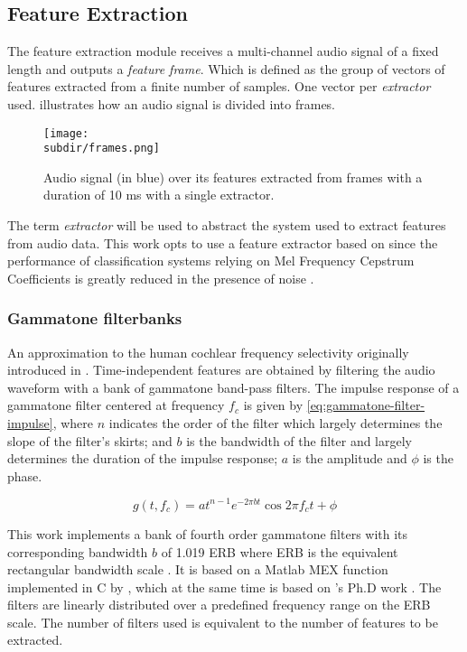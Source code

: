 \subsection{Feature Extraction} \label{subsec:feature-extraction}

The feature extraction module receives a multi-channel audio signal of a fixed
length and outputs a \emph{feature frame}. Which is defined as the group of
vectors of features extracted from a finite number of samples. One vector per
\emph{extractor} used.  illustrates how an audio
signal is divided into frames.

\begin{figure}
    \centering
    \texttt{[image: \\subdir/frames.png]}
    \caption[Audio frames]{Audio signal (in {\color{blue} blue}) over its
        features extracted from frames with a duration of 10 ms with a single
         extractor.}
    \label{fig:datasets-frames}
\end{figure}

The term \emph{extractor} will be used to abstract the system used to extract
features from audio data. This work opts to use a feature extractor based on
 since the performance of
classification systems relying on Mel Frequency Cepstrum Coefficients is
greatly reduced in the presence of noise \cite{marchegiani2018a}.

\subsubsection*{Gammatone filterbanks} \label{subsubsec:gammatone-filterbank}

An approximation to the human cochlear frequency selectivity originally
introduced in \cite{GTF1998}. Time-independent features are obtained by
filtering the audio waveform with a bank of gammatone band-pass filters. The
impulse response of a gammatone filter centered at frequency $f_c$ is given by
\cref{eq:gammatone-filter-impulse}, where $n$ indicates the order of the filter
which largely determines the slope of the filter's skirts; and $b$ is the
bandwidth of the filter and largely determines the duration of the impulse
response; $a$ is the amplitude and $\phi$ is the phase.

\begin{equation}
    g(t, f_c) = a t^{n-1}e^{-2 \pi b t} \cos{2 \pi f_c t + \phi}
    \label{eq:gammatone-filter-impulse}
\end{equation}

This work implements a bank of fourth order gammatone filters with its
corresponding bandwidth $b$ of 1.019 ERB where ERB is the equivalent
rectangular bandwidth scale \cite{GLASBERG1990103}. It is based on a Matlab MEX
function implemented in C by \citeauthor{CorrelogramMa2007}
\cite{CorrelogramMa2007}, which at the same time is based on
\citeauthor{Cooke1993ModellingAP}'s Ph.D work \cite{Cooke1993ModellingAP}. The
filters are linearly distributed over a predefined frequency range on the ERB
scale. The number of filters used is equivalent to the number of features to be
extracted. 